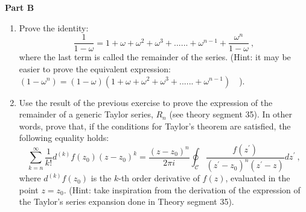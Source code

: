 \documentclass[fleqn]{article}
\begin{document}
  \textbf{Part B}
  \begin{enumerate}
    \item Prove the identity:
    $$\frac{1}{1-\omega} = 1 + \omega +\omega^2 + \omega^3 + ...... + \omega^{n-1}  + \frac{\omega^n}{1- \omega}~,$$
    where the last term is called the remainder of the series. (Hint: it may be easier to prove the equivalent expression: $(1- \omega^n) =(1- \omega)( 1 + \omega +\omega^2 + \omega^3 + ...... + \omega^{n-1} )$~~).

    \item  Use the result of the previous exercise to prove the expression of the remainder of a generic Taylor series, $R_n$ (see theory segment 35).  In other words, prove that, if the conditions for Taylor's theorem are satisfied, the following equality holds: 
    $$\sum^{\infty}_{k=n} \frac{1}{k!} d^{(k)} f(z_0) (z-z_0)^k = \frac{(z-z_0)^n}{2 \pi i} \oint_{\mathcal C}  \frac{f(z^\prime)}{(z^\prime - z_0)^n(z^\prime - z)} dz^\prime ~,$$
    where $d^{(k)} f(z_0)$ is the $k$-th order derivative of $f(z)$, evaluated in the point $z=z_0$.   (Hint: take inspiration from the derivation of the expression of the Taylor's series expansion done in Theory segment 35). 
    
  \end{enumerate}
\end{document}
